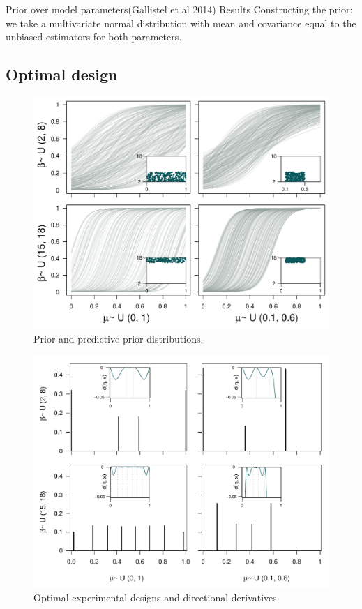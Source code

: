 \documentclass[preprint,review,12pt]{elsarticle}
\begin{document}
Prior over model parameters(Gallistel et al 2014)
Results
Constructing the prior: we take a multivariate normal distribution with mean and covariance equal to the unbiased estimators for both parameters.


\subsection{Optimal design}

\begin{figure}
\includegraphics[width=\textwidth]{Prior_and_Predictive.pdf}
\caption{Prior and predictive prior distributions.}
\label{fig:ppd}
\end{figure}

\begin{figure}
\includegraphics[width=\textwidth]{Support_detadx.pdf}
\caption{Optimal experimental designs and directional derivatives.}
\label{fig:detadx}
\end{figure}
\end{document}
